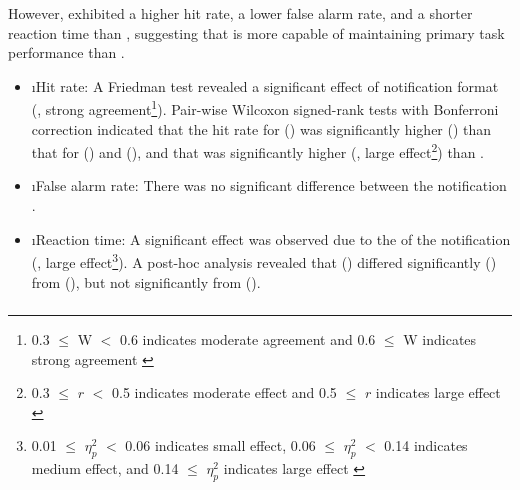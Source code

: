 However, \iconnotif{} exhibited a higher hit rate, a lower false alarm rate, and a shorter reaction time than \textnotif{}, suggesting that \iconformat{} is more capable of maintaining primary task performance than \textformat{}. 

\begin{itemize}
    \item \i{Hit rate}: A Friedman test revealed a significant effect of notification format (, strong agreement\footnote{0.3 $\leq{}$ W $<$ 0.6 indicates moderate agreement and 0.6 $\leq{}$ W indicates strong agreement \cite{gibbons_nonparametric_2020, tomczak_need_2014}}). Pair-wise Wilcoxon signed-rank tests with Bonferroni correction indicated that the hit rate for \nonotif{} () was significantly higher () than that for \iconnotif{} () and \textnotif{} (), and that \iconnotif{} was significantly higher (, large effect\footnote{0.3 $\leq{}$ $r$ $<$ 0.5 indicates moderate effect and 0.5 $\leq{}$ $r$ indicates large effect \cite{tomczak_need_2014, goss_sampson_statistical_2019}}) than \textnotif{}.

    \item \i{False alarm rate}: There was no significant difference between the notification .


    \item \i{Reaction time}: A significant effect was observed due to the \format{} of the notification (, large effect\footnote{0.01 $\leq{}$ $\eta^{2}_{p}$ $<$ 0.06 indicates small effect, 0.06 $\leq{}$ $\eta^{2}_{p}$ $<$ 0.14 indicates medium effect, and 0.14 $\leq{}$ $\eta^{2}_{p}$ indicates large effect \cite{tomczak_need_2014, goss_sampson_statistical_2019}}). A post-hoc analysis revealed that \textnotif{} () differed significantly () from \nonotif{} (), but not significantly from \iconnotif{} ().
\end{itemize}


\subsubsection*{\Interruption{}}
\label{sec:IconNotif:study1:interruption_parameter}

